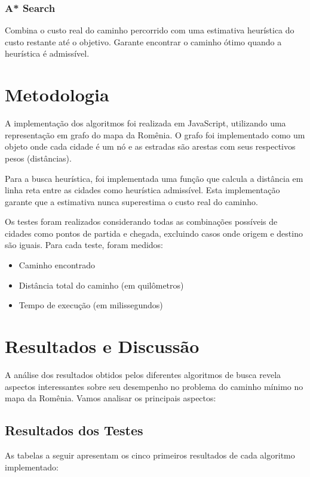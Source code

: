 \documentclass[12pt,a4paper]{article}
\begin{document}
\subsubsection{A* Search}
Combina o custo real do caminho percorrido com uma estimativa heurística do custo restante até o objetivo. Garante encontrar o caminho ótimo quando a heurística é admissível.

\section{Metodologia}
A implementação dos algoritmos foi realizada em JavaScript, utilizando uma representação em grafo do mapa da Romênia. O grafo foi implementado como um objeto onde cada cidade é um nó e as estradas são arestas com seus respectivos pesos (distâncias).

Para a busca heurística, foi implementada uma função que calcula a distância em linha reta entre as cidades como heurística admissível. Esta implementação garante que a estimativa nunca superestima o custo real do caminho.

Os testes foram realizados considerando todas as combinações possíveis de cidades como pontos de partida e chegada, excluindo casos onde origem e destino são iguais. Para cada teste, foram medidos:
\begin{itemize}
    \item Caminho encontrado
    \item Distância total do caminho (em quilômetros)
    \item Tempo de execução (em milissegundos)
\end{itemize}

\section{Resultados e Discussão}

A análise dos resultados obtidos pelos diferentes algoritmos de busca revela aspectos interessantes sobre seu desempenho no problema do caminho mínimo no mapa da Romênia. Vamos analisar os principais aspectos:

\subsection{Resultados dos Testes}

As tabelas a seguir apresentam os cinco primeiros resultados de cada algoritmo implementado:
\end{document}
